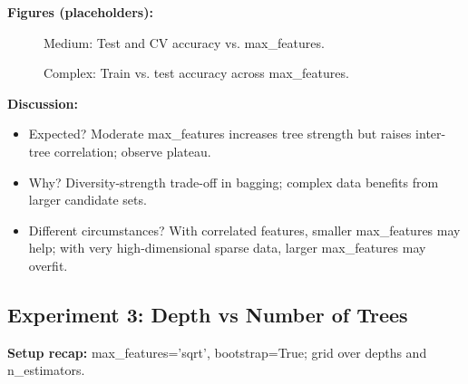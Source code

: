 \documentclass[conference]{IEEEtran}
\begin{document}
\textbf{Figures (placeholders):}
\begin{figure}[h]
  \centering
  \caption{Medium: Test and CV accuracy vs. max\_features.}
  \label{fig:exp2-medium-acc}
\end{figure}
\begin{figure}[h]
  \centering
  \caption{Complex: Train vs. test accuracy across max\_features.}
  \label{fig:exp2-complex-train-test}
\end{figure}

\textbf{Discussion:}
\begin{itemize}
  \item Expected? Moderate max\_features increases tree strength but raises inter-tree correlation; observe plateau.
  \item Why? Diversity-strength trade-off in bagging; complex data benefits from larger candidate sets.
  \item Different circumstances? With correlated features, smaller max\_features may help; with very high-dimensional sparse data, larger max\_features may overfit.
\end{itemize}

\subsection{Experiment 3: Depth vs Number of Trees}
\label{sec:results-exp3}
\textbf{Setup recap:} max\_features='sqrt', bootstrap=True; grid over depths and n\_estimators.
\end{document}

